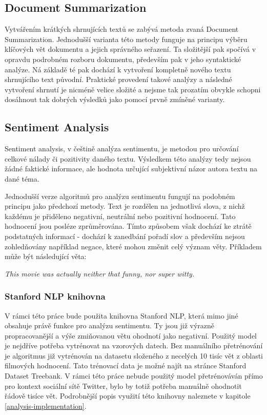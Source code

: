 \documentclass[thesis=B,czech]{FITthesis}[2012/06/26]
\begin{document}
\subsection{Document Summarization}
	Vytvářením krátkých shrnujících textů se zabývá metoda zvaná Document Summarization. Jednodušší varianta této metody funguje na principu výběru klíčových vět dokumentu a jejich správného seřazení. Ta složitější pak spočívá v opravdu podrobném rozboru dokumentu, především pak v jeho syntaktické analýze. Ná základě té pak dochází k vytvoření kompletně nového textu shrnujícího text původní. Praktické provedení takové analýzy a následné vytvoření shrnutí je nicméně velice složité a nejsme tak prozatím obvykle schopni dosáhnout tak dobrých výsledků jako pomocí prvně zmíněné varianty\cite{aaaa}. 


\subsection{Sentiment Analysis}
\label{sentiment-analysis}
	Sentiment analysis, v češtině analýza sentimentu, je metodou pro určování celkové nálady či pozitivity daného textu. Výsledkem této analýzy tedy nejsou žádné faktické informace, ale hodnota určující subjektivní názor autora textu na dané téma. 
	
	Jednodušší verze algoritmů pro analýzu sentimentu fungují na podobném principu jako předchozí metody. Text je rozdělen na jednotlivá slova, z nichž každému je přiděleno negativní, neutrální nebo pozitivní hodnocení. Tato hodnocení jsou posléze zprůměrována. Tímto způsobem však dochází ke ztrátě podstatných informací - dochází k zanedbání pořadí slov a především nejsou zohledňovány například negace, které mohou změnit celý význam věty. Příkladem může být následující věta:

\textit{This movie was actually neither that funny, nor super witty.}	

\subsubsection{Stanford NLP knihovna}

	V rámci této práce bude použita knihovna Stanford NLP\cite{sssss}, která mimo jiné obsahuje právě funkce pro analýzu sentimentu. Ty jsou již výrazně propracovanější a výše zmiňovanou větu ohodnotí jako negativní. Použitý model je nejdříve potřeba vytrénovat na vzorových datech. Bez manuálního přetrénování je algoritmus již vytrénován na datasetu složeného z necelých 10 tisíc vět z oblasti filmových hodnocení. Tato trénovací data je možné najít na stránce Stanford Dataset Treebank\cite{ssdassa}. V rámci této práce nebude použitý model přetrénováván přímo pro kontext sociální sítě Twitter, bylo by totiž potřeba manuálně ohodnotit řádově tisíce vět. Podrobnější popis využití této knihovny naleznete v kapitole \ref{analysis-implementation}. 
\end{document}
